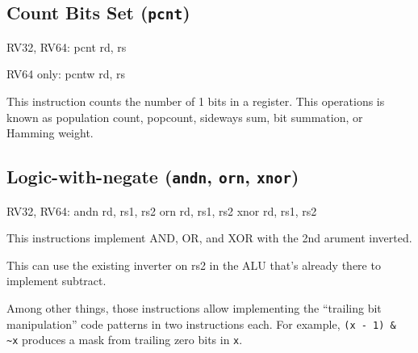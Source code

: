 %
%


\subsection{Count Bits Set (\texttt{pcnt})}

\begin{rvb}
  RV32, RV64:
    pcnt rd, rs

  RV64 only:
    pcntw rd, rs
\end{rvb}

This instruction counts the number of 1 bits in a register. This operations is known as
population count, popcount, sideways sum, bit summation, or Hamming weight.~\cite{HammingWeight,Warren12}




\subsection{Logic-with-negate (\texttt{andn}, \texttt{orn}, \texttt{xnor})}

\begin{rvb}
  RV32, RV64:
    andn rd, rs1, rs2
    orn  rd, rs1, rs2
    xnor rd, rs1, rs2
\end{rvb}

This instructions implement AND, OR, and XOR with the 2nd arument inverted.



This can use the existing inverter on rs2 in the ALU that's already there to
implement subtract.

Among other things, those instructions allow implementing the ``trailing bit
manipulation'' code patterns in two instructions each. For example, {\tt (x -
1) \& \textasciitilde{}x} produces a mask from trailing zero bits in {\tt x}.


